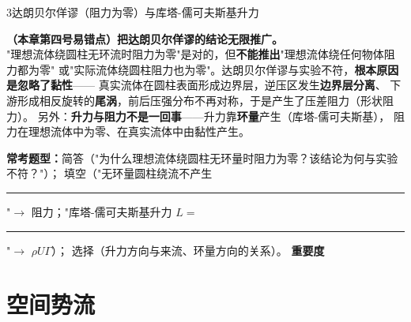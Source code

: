 \begin{kaodian}{3}{达朗贝尔佯谬（阻力为零）与库塔-儒可夫斯基升力}
\begin{yicuo}
\textbf{（本章第四号易错点）把达朗贝尔佯谬的结论无限推广。}\\
"理想流体绕圆柱无环流时阻力为零"是对的，但\textbf{不能推出}"理想流体绕任何物体阻力都为零"
或"实际流体绕圆柱阻力也为零"。达朗贝尔佯谬与实验不符，\textbf{根本原因是忽略了黏性}——
真实流体在圆柱表面形成边界层，逆压区发生\textbf{边界层分离}、
下游形成相反旋转的\textbf{尾涡}，前后压强分布不再对称，于是产生了压差阻力（形状阻力）。
另外：\textbf{升力与阻力不是一回事}——升力靠\textbf{环量}产生（库塔-儒可夫斯基），
阻力在理想流体中为零、在真实流体中由黏性产生。
\end{yicuo}

\textbf{常考题型：}简答（"为什么理想流体绕圆柱无环量时阻力为零？该结论为何与实验不符？"）；
填空（"无环量圆柱绕流不产生\rule{1.4cm}{0.4pt}"$\to$ 阻力；"库塔-儒可夫斯基升力 $L=$ \rule{1.6cm}{0.4pt}"$\to$ $\rho U\Gamma$）；
选择（升力方向与来流、环量方向的关系）。
\textbf{重要度 }\quad{}\quad{}
\end{kaodian}

\section{空间势流}

